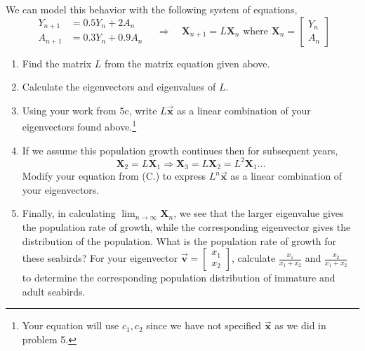 \documentclass[letter,11pt]{article}
\theoremstyle{definition}
\begin{document}
We can model this behavior with the following system of equations,
$$
\begin{aligned}
Y_{n+1} & =0.5 Y_n+2 A_n \\
A_{n+1} & =0.3 Y_n+0.9 A_n
\end{aligned} \quad \Rightarrow \quad \mathbf{X}_{n+1}=L \mathbf{X}_n \text { where } \mathbf{X}_n=\left[\begin{array}{l}
Y_n \\
A_n
\end{array}\right]
$$
\begin{enumerate}[label = (\Alph*.)]
    \item Find the matrix $L$ from the matrix equation given above.
    \item Calculate the eigenvectors and eigenvalues of $L$.
    \item Using your work from $5 \mathrm{c}$, write $L \vec{\boldsymbol{x}}$ as a linear combination of your eigenvectors found above.\footnote{Your equation will use $c_1, c_2$ since we have not specified $\vec{\boldsymbol{x}}$ as we did in problem 5.}
    \item If we assume this population growth continues then for subsequent years,
    $$\mathbf{X}_2=L \mathbf{X}_1 \Rightarrow \mathbf{X}_3=L \mathbf{X}_2=L^2 \mathbf{X}_1 \ldots$$ Modify your equation from (C.) to express $L^n \vec{\boldsymbol{x}}$ as a linear combination of your eigenvectors.
    \item Finally, in calculating $\lim _{n \rightarrow \infty} \mathbf{X}_n$, we see that the larger eigenvalue gives the population rate of growth, while the corresponding eigenvector gives the distribution of the population. What is the population rate of growth for these seabirds?
For your eigenvector $\vec{\boldsymbol{v}}=\begin{bmatrix}x_1 \\ x_2\end{bmatrix}$, calculate $\frac{x_1}{x_1+x_2}$ and $\frac{x_2}{x_1+x_2}$ to determine the corresponding population distribution of immature and adult seabirds.
\end{enumerate}
\end{document}
